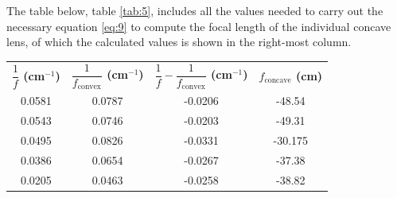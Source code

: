 \documentclass[12pt]{article}
\begin{document}
The table below, table \ref{tab:5}, includes all the values needed to carry out the necessary equation \ref{eq:9} to compute the focal length of the individual
concave lens, of which the calculated values is shown in the right-most column.

\begin{table}[H]
    \centering

    \begin{tabular}{|c|c|c|c|}
    \hline
    \multirow[c]{2}{*}{\textbf{$\dfrac{1}{f}$ (cm$^{-1}$)}} & 
    \multirow[c]{2}{*}{\textbf{$\dfrac{1}{f_{\text{convex}}}$ (cm$^{-1}$)}} & 
    \multirow[c]{2}{*}{\textbf{$\dfrac{1}{f} - \dfrac{1}{f_{\text{convex}}}$ (cm$^{-1}$)}} & 
    \multirow[c]{2}{*}{\textbf{$f_{\text{concave}}$ (cm)}} \\
    & & & \\
    \hline
    0.0581                                                                                                & 0.0787                                                                                                         & -0.0206                                                                                                                      & -48.54                                                                       \\ \hline
    0.0543                                                                                                & 0.0746                                                                                                         & -0.0203                                                                                                                      & -49.31                                                                       \\ \hline
    0.0495                                                                                                & 0.0826                                                                                                         & -0.0331                                                                                                                      & -30.175                                                                      \\ \hline
    0.0386                                                                                                & 0.0654                                                                                                         & -0.0267                                                                                                                      & -37.38                                                                       \\ \hline
    0.0205                                                                                                & 0.0463                                                                                                         & -0.0258                                                                                                                      & -38.82                                                                       \\ \hline
    \end{tabular}


\end{table}
\end{document}
